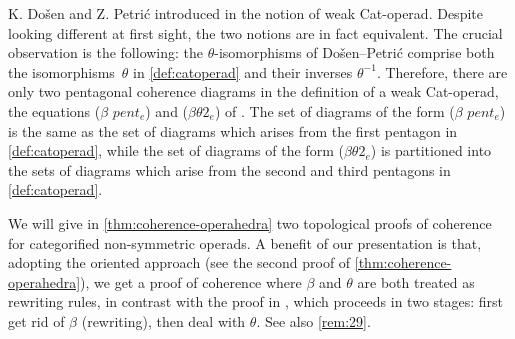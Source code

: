 \begin{rem}
\label{rem:DPLA}
K. Do{\v s}en and Z. Petri{\'c} introduced in \cite[Sec.~12]{DP15} the notion of weak Cat-operad.
Despite looking different at first sight, the two notions are in fact equivalent.
The crucial observation is the following: the $\theta$-isomorphisms of Do{\v s}en--Petri{\'c} comprise both the isomorphisms~$\theta$ in \cref{def:catoperad} and their inverses $\theta^{-1}$.
Therefore, there are only two pentagonal coherence diagrams in the definition of a weak Cat-operad, the equations ($\beta$ $pent_e$) and ($\beta\theta 2_e$) of \cite[Section 9]{DP15}.
The set of diagrams of the form ($\beta$ $pent_e$) is the same as the set of diagrams which arises from the first pentagon in \cref{def:catoperad}, while the set of diagrams of the form ($\beta\theta 2_e$) is partitioned into the sets of diagrams which arise from the second and third pentagons in \cref{def:catoperad}.

We will give in \cref{thm:coherence-operahedra} two topological proofs of coherence for categorified non-symmetric operads.
A benefit of our presentation is that, adopting the oriented approach (see the second proof of \cref{thm:coherence-operahedra}), we get a proof of coherence where $\beta$ and $\theta$ are both treated as rewriting rules, in contrast with the proof in \cite{DP15}, which proceeds in two stages: first get rid of $\beta$ (rewriting), then deal with $\theta$. 
See also \cref{rem:29}.
\end{rem}

